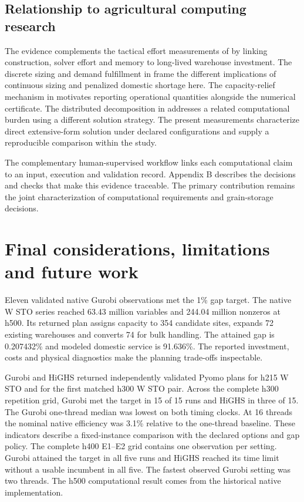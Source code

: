 \documentclass[
  english,
  11pt,
  a4paper,
  authoryear,
  preprint]{elsarticle}
\begin{document}
\subsection{Relationship to agricultural computing
research}\label{relationship-to-agricultural-computing-research}

The evidence complements the tactical effort measurements of
\citet{reis2023} by linking construction, solver effort and memory to
long-lived warehouse investment. The discrete sizing and demand
fulfillment in \citet{pourmohammadi2020} frame the different
implications of continuous sizing and penalized domestic shortage here.
The capacity-relief mechanism in \citet{milanez2026} motivates reporting
operational quantities alongside the numerical certificate. The
distributed decomposition in \citet{shastri2011} addresses a related
computational burden using a different solution strategy. The present
measurements characterize direct extensive-form solution under declared
configurations and supply a reproducible comparison within the study.

The complementary human-supervised workflow links each computational
claim to an input, execution and validation record. Appendix B describes
the decisions and checks that make this evidence traceable. The primary
contribution remains the joint characterization of computational
requirements and grain-storage decisions.

\section{Final considerations, limitations and future
work}\label{final-considerations-limitations-and-future-work}

Eleven validated native Gurobi observations met the 1\% gap target. The
native W STO series reached 63.43 million variables and 244.04 million
nonzeros at h500. Its returned plan assigns capacity to 354 candidate
sites, expands 72 existing warehouses and converts 74 for bulk handling.
The attained gap is 0.207432\% and modeled domestic service is 91.636\%.
The reported investment, costs and physical diagnostics make the
planning trade-offs inspectable.

Gurobi and HiGHS returned independently validated Pyomo plans for h215 W
STO and for the first matched h300 W STO pair. Across the complete h300
repetition grid, Gurobi met the target in 15 of 15 runs and HiGHS in
three of 15. The Gurobi one-thread median was lowest on both timing
clocks. At 16 threads the nominal native efficiency was 3.1\% relative
to the one-thread baseline. These indicators describe a fixed-instance
comparison with the declared options and gap policy. The complete h400
E1--E2 grid contains one observation per setting. Gurobi attained the
target in all five runs and HiGHS reached its time limit without a
usable incumbent in all five. The fastest observed Gurobi setting was
two threads. The h500 computational result comes from the historical
native implementation.
\end{document}
